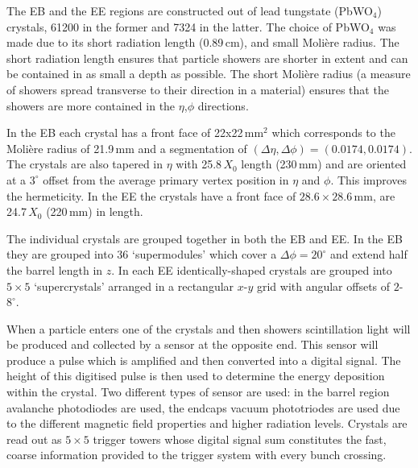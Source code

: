 The EB and the EE regions are constructed out of lead tungstate (PbWO$_{4}$) crystals, 61200 in the former and 7324 in the latter. The choice of PbWO$_{4}$ was made due to its short radiation length (0.89\,cm), and small Moli\`{e}re radius. The short radiation length ensures that particle showers are shorter in extent and can be contained in as small a depth as possible. The short Moli\`{e}re radius (a measure of showers spread transverse to their direction in a material) ensures that the showers are more contained in the $\eta$,$\phi$ directions. 

In the EB each crystal has a front face of 22x22\,mm$^{2}$ which corresponds to the Moli\`{e}re radius of 21.9\,mm and a segmentation of $(\Delta\eta,\Delta\phi) = (0.0174,0.0174)$. 
The crystals are also tapered in $\eta$ with 25.8\,$X_{0}$ length (230\,mm) and are oriented at a $3^{\circ}$ offset from the average primary vertex position in $\eta$ and $\phi$. This improves the hermeticity.
In the EE the crystals have a front face of $28.6\times{}28.6$\,mm, are 24.7\,$X_{0}$ (220\,mm) in length. 

The individual crystals are grouped together in both the EB and EE. In the EB they are grouped into 36 `supermodules' which cover a $\Delta\phi = 20^{\circ}$ and extend half the barrel length in $z$.
In each EE identically-shaped crystals are grouped into $5\times5$ `supercrystals' arranged in a rectangular $x$-$y$ grid with angular offsets of $2$-$8^{\circ}$.

When a particle enters one of the crystals and then showers scintillation light will be produced and collected by a sensor at the opposite end. This sensor will produce a pulse which is amplified and then converted into a digital signal. The height of this digitised pulse is then used to determine the energy deposition within the crystal. 
Two different types of sensor are used: in the barrel region avalanche photodiodes are used, the endcaps vacuum phototriodes are used due to the different magnetic field properties and higher radiation levels.
Crystals are read out as $5\times{5}$ trigger towers whose digital signal sum constitutes the fast, coarse information provided to the trigger system with every bunch crossing.



